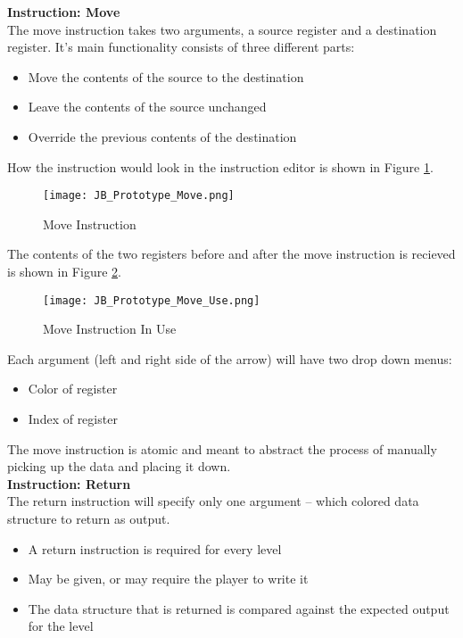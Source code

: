 \textbf{Instruction: Move}\\

The move instruction takes two arguments, a source register and a destination register.
It's main functionality consists of three different parts:

\begin{itemize}
  \item Move the contents of the source to the destination
  \item Leave the contents of the source unchanged
  \item Override the previous contents of the destination
\end{itemize}

How the instruction would look in the instruction editor is shown in Figure
\ref{fig:Move_Instruction}.

\begin{figure}[!hb]
  \caption{Move Instruction}
  \label{fig:Move_Instruction}
  \centering
  \texttt{[image: JB\_Prototype\_Move.png]}
\end{figure}

The contents of the two registers before and after the move instruction is
recieved is shown in Figure \ref{fig:Move_Instruction_Use}.

\begin{figure}[!hb]
  \caption{Move Instruction In Use}
  \label{fig:Move_Instruction_Use}
  \centering
  \texttt{[image: JB\_Prototype\_Move\_Use.png]}
\end{figure}

Each argument (left and right side of the arrow) will have two drop down menus:
\begin{itemize}
  \item Color of register
  \item Index of register
\end{itemize}

The move instruction is atomic and meant to abstract the process of manually
picking up the data and placing it down.\\

\textbf{Instruction: Return}\\

The return instruction will specify only one argument -- which colored data structure
to return as output.
\begin{itemize}
  \item A return instruction is required for every level
  \item May be given, or may require the player to write it
  \item The data structure that is returned is compared against the expected
  output for the level
\end{itemize}

